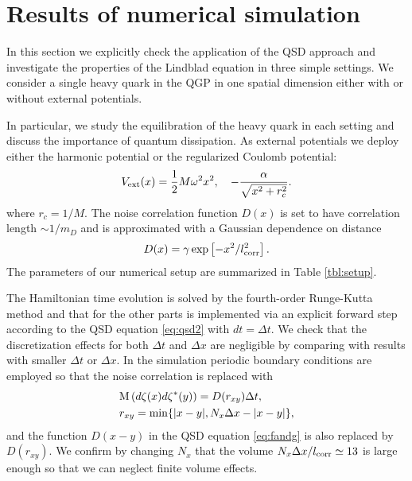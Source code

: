 \documentclass[prd,11pt, amsmath, amsymb, aps, reprint, tightenlines, nofootinbib, longbibliography, abbrv, preprintnumbers]{revtex4-1}
\begin{document}
\section{Results of numerical simulation}
\label{sec:results}
In this section we explicitly check the application of the QSD approach and investigate the properties of the Lindblad equation in three simple settings.
We consider a single heavy quark in the QGP in one spatial dimension either with or without external potentials.

In particular, we study the equilibration of the heavy quark in each setting and discuss the importance of quantum dissipation.
As external potentials we deploy either the harmonic potential or the regularized Coulomb potential:
\begin{align}
\label{eq:potential}
V_{\rm ext}(x) = \frac{1}{2}M\omega^2x^2, \quad -\frac{\alpha}{\sqrt{x^2 + r_c^2}}.
\end{align}
where $r_c=1/M$. The noise correlation function $D(x)$ is set to have correlation length $\sim 1/m_D$ and is approximated with a Gaussian dependence on distance
\begin{align}
\label{eq:dgaussian}
D(x) = \gamma \exp\left[-x^2/l_{\rm corr}^2\right].
\end{align}
The parameters of our numerical setup are summarized in Table \ref{tbl:setup}.

The Hamiltonian time evolution is solved by the fourth-order Runge-Kutta method and that for the other parts is implemented via an explicit forward step according to the QSD equation \eqref{eq:qsd2} with $dt=\Delta t$.
We check that the discretization effects for both $\Delta t$ and $\Delta x$ are negligible by comparing with results with smaller $\Delta t$ or $\Delta x$.
In the simulation periodic boundary conditions are employed so that the noise correlation is replaced with
\begin{subequations}
\begin{align}
&{\rm M} \left(d\zeta(x)d\zeta^*(y)\right) = D(r_{xy})\Delta t , \\
& r_{xy} = \min \{ |x-y|, N_x\Delta x - |x-y|\},
\end{align}
\end{subequations}
and the function $D(x-y)$ in the QSD equation \eqref{eq:fandg} is also replaced by $D(r_{xy})$.
We confirm by changing $N_x$ that the volume $N_x\Delta x/l_{\rm corr} \simeq 13$ is large enough so that we can neglect finite volume effects.
\end{document}
